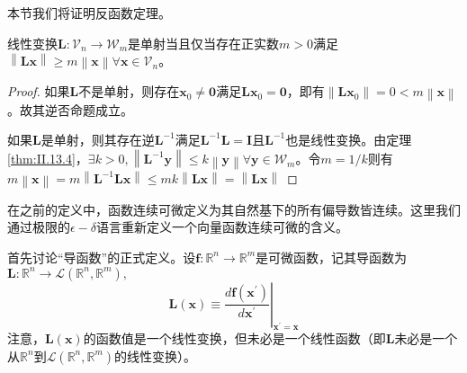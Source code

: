 \documentclass[main.tex]{subfiles}
\begin{document}
本节我们将证明反函数定理。
\begin{lemma}\label{thm:inv_func_l1}
线性变换$\mathbf{L}:\mathcal{V}_n\rightarrow\mathcal{W}_m$是单射当且仅当存在正实数$m>0$满足$\left\|\mathbf{Lx}\right\|\geq m \left\|\mathbf{x}\right\|\forall\mathbf{x}\in\mathcal{V}_n$。
\end{lemma}
\begin{proof}
如果$\mathbf{L}$不是单射，则存在$\mathbf{x}_0\neq\mathbf{0}$满足$\mathbf{Lx}_0=\mathbf{0}$，即有$\left\|\mathbf{Lx}_0\right\|=0<m\left\|\mathbf{x}\right\|$。故其逆否命题成立。

如果$\mathbf{L}$是单射，则其存在逆$\mathbf{L}^{-1}$满足$\mathbf{L}^{-1}\mathbf{L}=\mathbf{I}$且$\mathbf{L}^{-1}$也是线性变换。由定理\ref{thm:II.13.4}，$\exists k>0, \left\|\mathbf{L}^{-1}\mathbf{y}\right\|\leq k\left\|\mathbf{y}\right\|\forall\mathbf{y}\in\mathcal{W}_m$。令$m=1/k$则有$m\left\|\mathbf{x}\right\|=m\left\|\mathbf{L}^{-1}\mathbf{Lx}\right\|\leq mk\left\|\mathbf{Lx}\right\|=\left\|\mathbf{Lx}\right\|$
\end{proof}

在之前的定义中，函数连续可微定义为其自然基下的所有偏导数皆连续。这里我们通过极限的$\epsilon-\delta$语言重新定义一个向量函数连续可微的含义。

首先讨论“导函数”的正式定义。设$\mathbf{f}:\mathbb{R}^n\rightarrow\mathbb{R}^m$是可微函数，记其导函数为$\mathbf{L}:\mathbb{R}^n\rightarrow\mathcal{L}\left(\mathbb{R}^n,\mathbb{R}^m\right),$
\[
\mathbf{L}\left(\mathbf{x}\right)\equiv\left.\frac{d\mathbf{f}\left(\mathbf{x}^\prime\right)}{d\mathbf{x}^\prime}\right|_{\mathbf{x^\prime}=\mathbf{x}}
\]
注意，$\mathbf{L}\left(\mathbf{x}\right)$的函数值是一个线性变换，但未必是一个线性函数（即$\mathbf{L}$未必是一个从$\mathbb{R}^n$到$\mathcal{L}\left(\mathbb{R}^n,\mathbb{R}^m\right)$的线性变换）。
\end{document}
